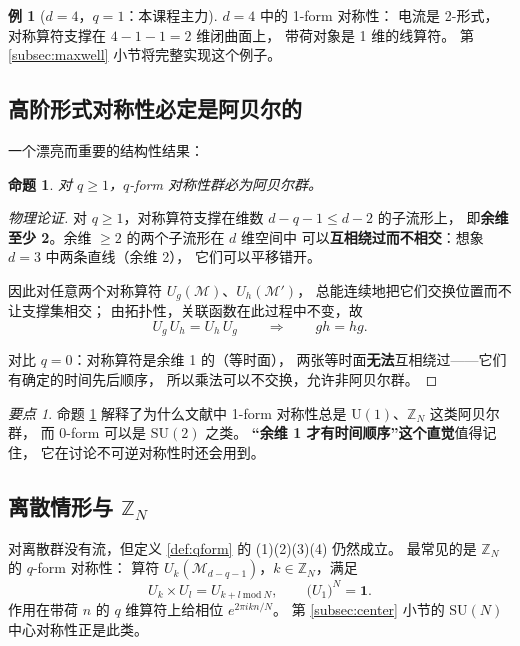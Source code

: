 \documentclass[UTF8,a4paper,11pt]{ctexart}
\theoremstyle{plain}
\newtheorem{proposition}{命题}[section]
\theoremstyle{definition}
\newtheorem{example}{例}[section]
\theoremstyle{remark}
\newtheorem{keypoint}{要点}[section]
\newcommand{\ZZ}{\mathbb{Z}}
\newcommand{\Uone}{\mathrm{U}(1)}
\newcommand{\SUgrp}{\mathrm{SU}}
\newcommand{\Mfd}{\mathcal{M}}
\newcommand{\Uop}{U}
\begin{document}
\begin{example}[$d=4$，$q=1$：本课程主力]
$d=4$ 中的 1-form 对称性：
电流是 2-形式，对称算符支撑在 $4-1-1=2$ 维闭曲面上，
带荷对象是 1 维的线算符。
第 \ref{subsec:maxwell} 小节将完整实现这个例子。
\end{example}

\subsection{高阶形式对称性必定是阿贝尔的}
\label{subsec:abelian}

一个漂亮而重要的结构性结果：

\begin{proposition}
\label{prop:abelian}
对 $q\ge1$，$q$-form 对称性群必为阿贝尔群。
\end{proposition}

\begin{proof}[物理论证]
对 $q\ge1$，对称算符支撑在维数 $d-q-1\le d-2$ 的子流形上，
即\textbf{余维至少 2}。余维 $\ge2$ 的两个子流形在 $d$ 维空间中
可以\textbf{互相绕过而不相交}：想象 $d=3$ 中两条直线（余维 2），
它们可以平移错开。

因此对任意两个对称算符 $\Uop_g(\Mfd)$、$\Uop_h(\Mfd')$，
总能连续地把它们交换位置而不让支撑集相交；
由拓扑性，关联函数在此过程中不变，故
\begin{equation}
  \Uop_g\,\Uop_h=\Uop_h\,\Uop_g
  \qquad\Longrightarrow\qquad
  gh=hg .
\end{equation}

对比 $q=0$：对称算符是余维 1 的（等时面），
两张等时面\textbf{无法}互相绕过——它们有确定的时间先后顺序，
所以乘法可以不交换，允许非阿贝尔群。
\end{proof}

\begin{keypoint}
命题 \ref{prop:abelian} 解释了为什么文献中 1-form 对称性总是
$\Uone$、$\ZZ_N$ 这类阿贝尔群，
而 0-form 可以是 $\SUgrp(2)$ 之类。
\textbf{“余维 1 才有时间顺序”这个直觉}值得记住，
它在讨论不可逆对称性时还会用到。
\end{keypoint}

\subsection{离散情形与 \texorpdfstring{$\ZZ_N$}{ZN}}

对离散群没有流，但定义 \ref{def:qform} 的 (1)(2)(3)(4) 仍然成立。
最常见的是 $\ZZ_N$ 的 $q$-form 对称性：
算符 $\Uop_k(\Mfd_{d-q-1})$，$k\in\ZZ_N$，满足
\begin{equation}
  \Uop_k\times \Uop_l=\Uop_{k+l\ \mathrm{mod}\ N},
  \qquad
  \big(\Uop_1\big)^N=\mathbf 1 .
\end{equation}
作用在带荷 $n$ 的 $q$ 维算符上给相位 $e^{2\pi i kn/N}$。
第 \ref{subsec:center} 小节的 $\SUgrp(N)$ 中心对称性正是此类。
\end{document}
